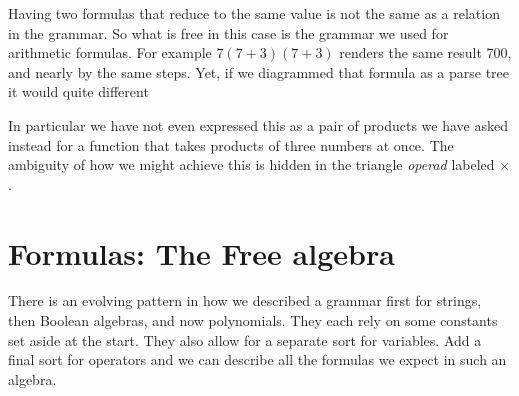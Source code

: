 \begin{remark}{}
    Having two formulas that reduce to the same value is not the same 
as a relation in the grammar.  So what is free in this case 
is the grammar we used for arithmetic formulas.  
For example $7(7+3)(7+3)$ renders the same result 700, and nearly 
by the same steps.  Yet, if we diagrammed that formula as a
parse tree it would quite different
\begin{center}
\end{center}    
In particular we have not even expressed this as a pair of products 
we have asked instead for a function that takes products of three 
numbers at once.  The ambiguity of how we might achieve this is hidden in the 
triangle \emph{operad} labeled $\times$.
\end{remark}

\section{Formulas: The Free algebra}

There is an evolving pattern in how we described a grammar first for strings, 
then Boolean algebras, and now polynomials.  They each rely on some 
constants set aside at the start.  They also allow for a separate sort for
variables.  Add a final sort for operators and we can describe all the formulas 
we expect in such an algebra.

